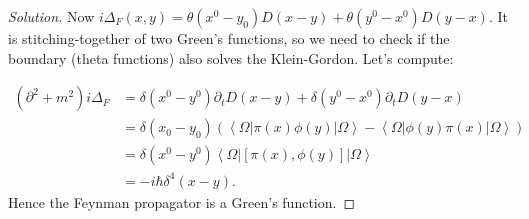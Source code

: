 \begin{proof}[Solution]
Now $i\Delta_F(x, y) = \theta(x^0 - y_0)D(x - y) + \theta(y^0 - x^0) D(y - x)$. It is stitching-together of two Green's functions, so we need to check if the boundary (theta functions) also solves the Klein-Gordon. Let's compute:

\begin{align*}
	(\partial^2 + m^2) i \Delta_F
	&=  \delta(x^0 - y^0) \partial_t D(x - y) + \delta(y^0 - x^0) \partial_t D(y - x) \\
	&= \delta(x_0 - y_0)\left(
		\left\langle \Omega \right| \pi(x) \phi(y) \left| \Omega \right\rangle 
		- \left\langle \Omega \right| \phi(y) \pi(x) \left| \Omega \right\rangle 
	\right)  \\
	&= \delta(x^0 - y^0) \left\langle \Omega \right| \left[ \pi(x), \phi(y) \right] \left| \Omega \right\rangle  \\
	&= - i \hbar \delta^4 (x - y)
.\end{align*}
Hence the Feynman propagator is a Green's function.
	\end{proof}


